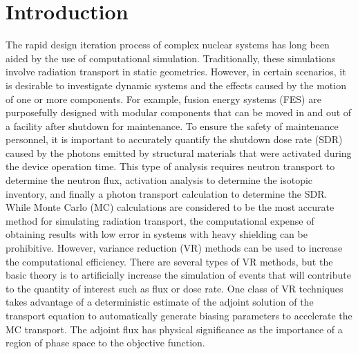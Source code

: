 
\chapter{Introduction} \label{ch:intro}

The rapid design iteration process of complex nuclear systems has long been
aided by the use of computational simulation.  Traditionally, these simulations
involve radiation transport in static geometries.  However, in certain
scenarios, it is desirable to investigate dynamic systems and the effects caused
by the motion of one or more components.  
For example, fusion energy systems (FES) are purposefully designed with modular components that can be moved in and
out of a facility after shutdown for maintenance.  
To ensure the safety of maintenance personnel, it is important to accurately quantify the
shutdown dose rate (SDR) caused by the photons emitted by structural materials that were
activated during the device operation time.  
This type of analysis requires neutron transport to determine the neutron flux,
activation analysis to determine the isotopic inventory, and finally a 
photon transport calculation to determine the SDR.
While Monte Carlo (MC) calculations are considered to be the most accurate method for simulating
radiation transport, the computational expense of obtaining results with low
error 
in systems with heavy shielding can be prohibitive.  
However, variance reduction (VR)
methods can be used to increase the computational efficiency.  
There are several types
of VR methods, but the basic theory is to artificially increase the simulation of
events that will contribute to the quantity of interest such as flux or dose
rate. 
 One class of VR techniques takes advantage of a deterministic estimate of the adjoint 
solution of the transport equation to automatically
generate biasing parameters to accelerate the MC transport. 
The adjoint flux has physical significance as the importance of a region of
phase space to the objective function.

